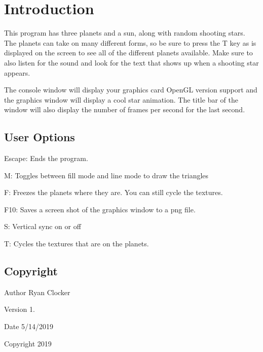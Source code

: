 \hypertarget{index_intro}{}\section{Introduction}\label{index_intro}
This program has three planets and a sun, along with random shooting stars. The planets can take on many different forms, so be sure to press the T key as is displayed on the screen to see all of the different planets available. Make sure to also listen for the sound and look for the text that shows up when a shooting star appears.

The console window will display your graphics card Open\+GL version support and the graphics window will display a cool star animation. The title bar of the window will also display the number of frames per second for the last second.\hypertarget{index_options}{}\subsection{User Options}\label{index_options}

\begin{DoxyItemize}
\item Escape\+: Ends the program.
\item M\+: Toggles between fill mode and line mode to draw the triangles
\item F\+: Freezes the planets where they are. You can still cycle the textures.
\item F10\+: Saves a screen shot of the graphics window to a png file.
\item S\+: Vertical sync on or off
\item T\+: Cycles the textures that are on the planets.
\end{DoxyItemize}



\hypertarget{index_copyright}{}\subsection{Copyright}\label{index_copyright}
\begin{DoxyAuthor}{Author}
Ryan Clocker 
\end{DoxyAuthor}
\begin{DoxyVersion}{Version}
1. 
\end{DoxyVersion}
\begin{DoxyDate}{Date}
5/14/2019 
\end{DoxyDate}
\begin{DoxyCopyright}{Copyright}
2019
\end{DoxyCopyright}


